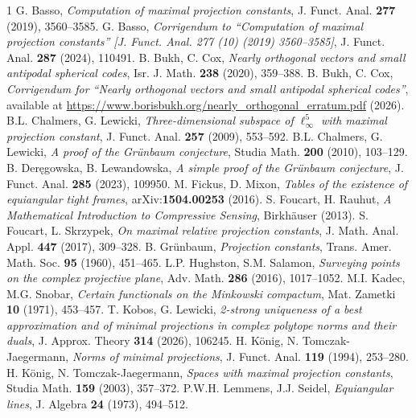 \documentclass[12pt, reqno]{amsart}
\theoremstyle{definition}
\theoremstyle{remark}
\numberwithin{equation}{section}
\begin{document}
\begin{thebibliography}{1}
 G. Basso, \emph{Computation of maximal projection constants}, J. Funct. Anal. \textbf{277} (2019), 3560--3585.
 G. Basso, \emph{Corrigendum to ``Computation of maximal projection constants'' [J. Funct. Anal. 277 (10) (2019) 3560--3585]}, J. Funct. Anal. \textbf{287} (2024), 110491.
 B. Bukh, C. Cox, \emph{Nearly orthogonal vectors and small antipodal spherical codes}, Isr. J. Math. \textbf{238} (2020), 359--388.
 B. Bukh, C. Cox, \emph{Corrigendum for ``Nearly orthogonal vectors and small antipodal spherical codes''}, available at \url{https://www.borisbukh.org/nearly_orthogonal_erratum.pdf} (2026).
 B.L. Chalmers, G. Lewicki, \emph{Three-dimensional subspace of $\ell_{\infty}^5$ with maximal projection constant}, J. Funct. Anal. \textbf{257} (2009), 553--592.
 B.L. Chalmers, G. Lewicki, \emph{A proof of the Gr\"unbaum conjecture}, Studia Math. \textbf{200} (2010), 103--129.
 B. Deręgowska, B. Lewandowska, \emph{A simple proof of the Gr\"unbaum conjecture}, J. Funct. Anal. \textbf{285} (2023), 109950.
 M. Fickus, D. Mixon, \emph{Tables of the existence of equiangular tight frames}, arXiv:\textbf{1504.00253} (2016).
 S. Foucart, H. Rauhut, \emph{A Mathematical Introduction to Compressive Sensing}, Birkh\"{a}user (2013).
 S. Foucart, L. Skrzypek, \emph{On maximal relative projection constants}, J. Math. Anal. Appl. \textbf{447} (2017), 309--328.
 B. Gr\"unbaum, \emph{Projection constants}, Trans. Amer. Math. Soc. \textbf{95} (1960), 451--465.
 L.P. Hughston, S.M. Salamon, \emph{Surveying points on the complex projective plane}, Adv. Math. \textbf{286} (2016), 1017--1052.
 M.I. Kadec, M.G. Snobar, \emph{Certain functionals on the Minkowski compactum}, Mat. Zametki \textbf{10} (1971), 453--457.
 T. Kobos, G. Lewicki, \emph{2-strong uniqueness of a best approximation and of minimal projections in complex polytope norms and their duals}, J. Approx. Theory \textbf{314} (2026), 106245.
 H. K\"onig, N. Tomczak-Jaegermann, \emph{Norms of minimal projections}, J. Funct. Anal. \textbf{119} (1994), 253--280.
 H. K\"onig, N. Tomczak-Jaegermann, \emph{Spaces with maximal projection constants}, Studia Math. \textbf{159} (2003), 357--372.
  P.W.H. Lemmens, J.J. Seidel, \emph{Equiangular lines}, J. Algebra \textbf{24} (1973), 494--512.

\end{thebibliography}
\end{document}
